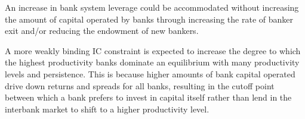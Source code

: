 \documentclass[english]{article}
\begin{document}
An increase in bank system leverage could be accommodated without increasing the amount of capital operated 
by banks through increasing the rate of banker exit and/or reducing the endowment of new bankers.

A more weakly binding IC constraint is expected to increase the degree to which the highest productivity 
banks dominate an equilibrium with many productivity levels and persistence. This is because higher 
amounts of bank capital operated drive down returns and spreads for all banks, resulting in the cutoff 
point between which a bank prefers to invest in capital itself rather than lend in the interbank market 
to shift to a higher productivity level.
\end{document}
